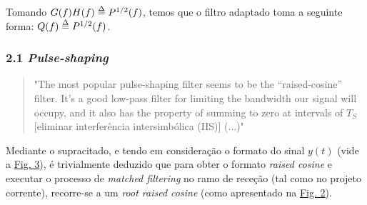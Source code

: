 Tomando $G(f)H(f) \delequal P^{1/2}(f)$, temos que o filtro adaptado toma a seguinte forma: $Q(f) \delequal P^{1/2}(f)$.\footnotemark[4]


\subsubsection{2.1 \textit{Pulse-shaping}}

\begin{quotation}
    "The most popular pulse-shaping filter seems to be the “raised-cosine” filter. It’s a good low-pass filter for limiting the bandwidth our signal will occupy, and it also has the property of summing to zero at intervals of $T_S$ [eliminar interferência intersimbólica (IIS)] (...)"\cite{pysdr}
\end{quotation}

Mediante o supracitado, e tendo em consideração o formato do sinal $y(t)$ (vide a \hyperref[fig:filtro-adaptado]{Fig. 3}), é trivialmente deduzido que para obter o formato \textit{raised cosine} e executar o processo de \textit{matched filtering} no ramo de receção (tal como no projeto corrente), recorre-se a um \textit{root raised cosine} (como apresentado na \hyperref[fig:gnuradio1]{Fig. 2}).